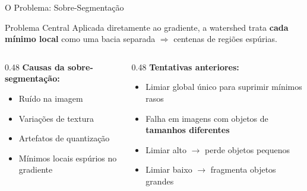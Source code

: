 \documentclass[aspectratio=169,12pt]{beamer}
\begin{document}
\begin{frame}{O Problema: Sobre-Segmenta\c{c}\~ao}

\begin{alertblock}{Problema Central}
Aplicada diretamente ao gradiente, a watershed trata \textbf{cada m\'inimo local} como uma bacia separada $\Rightarrow$ centenas de regi\~oes esp\'urias.
\end{alertblock}

\vspace{0.3cm}

\begin{columns}[T]
\begin{column}{0.48\textwidth}
\textbf{Causas da sobre-segmenta\c{c}\~ao:}
\begin{itemize}
  \item Ru\'ido na imagem
  \item Varia\c{c}\~oes de textura
  \item Artefatos de quantiza\c{c}\~ao
  \item M\'inimos locais esp\'urios no gradiente
\end{itemize}
\end{column}
\begin{column}{0.48\textwidth}
\textbf{Tentativas anteriores:}
\begin{itemize}
  \item Limiar global \'unico para suprimir m\'inimos rasos
  \item[\color{alertred}$\times$] Falha em imagens com objetos de \textbf{tamanhos diferentes}
  \item[\color{alertred}$\times$] Limiar alto $\to$ perde objetos pequenos
  \item[\color{alertred}$\times$] Limiar baixo $\to$ fragmenta objetos grandes
\end{itemize}
\end{column}
\end{columns}

\end{frame}
\end{document}
